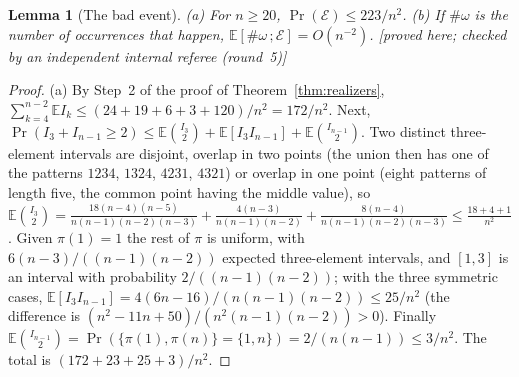 \documentclass[11pt,a4paper]{article}
\theoremstyle{plain}
\newtheorem{lemma}[theorem]{Lemma}
\theoremstyle{definition}
\theoremstyle{remark}
\newcommand{\status}[1]{\textsf{\small [#1]}}
\begin{document}
\begin{lemma}[The bad event]\label{lem:sharpbad}
(a) For $n\ge20$, $\Pr(\mathcal E)\le223/n^2$. (b) If $\#\omega$ is the number of occurrences that happen, $\mathbb E[\#\omega\,;\mathcal E]=O(n^{-2})$. \status{proved here; checked by an independent internal referee (round~5)}
\end{lemma}

\begin{proof}
(a) By Step~2 of the proof of Theorem~\ref{thm:realizers}, $\sum_{k=4}^{n-2}\mathbb EI_k\le(24+19+6+3+120)/n^2=172/n^2$. Next, $\Pr(I_3+I_{n-1}\ge2)\le\mathbb E\binom{I_3}2+\mathbb E[I_3I_{n-1}]+\mathbb E\binom{I_{n-1}}2$. Two distinct three-element intervals are disjoint, overlap in two points (the union then has one of the patterns $1234$, $1324$, $4231$, $4321$) or overlap in one point (eight patterns of length five, the common point having the middle value), so $\mathbb E\binom{I_3}2=\frac{18(n-4)(n-5)}{n(n-1)(n-2)(n-3)}+\frac{4(n-3)}{n(n-1)(n-2)}+\frac{8(n-4)}{n(n-1)(n-2)(n-3)}\le\frac{18+4+1}{n^2}$. Given $\pi(1)=1$ the rest of $\pi$ is uniform, with $6(n-3)/((n-1)(n-2))$ expected three-element intervals, and $[1,3]$ is an interval with probability $2/((n-1)(n-2))$; with the three symmetric cases, $\mathbb E[I_3I_{n-1}]=4(6n-16)/(n(n-1)(n-2))\le25/n^2$ (the difference is $(n^2-11n+50)/(n^2(n-1)(n-2))>0$). Finally $\mathbb E\binom{I_{n-1}}2=\Pr(\{\pi(1),\pi(n)\}=\{1,n\})=2/(n(n-1))\le3/n^2$. The total is $(172+23+25+3)/n^2$.


\end{proof}
\end{document}
